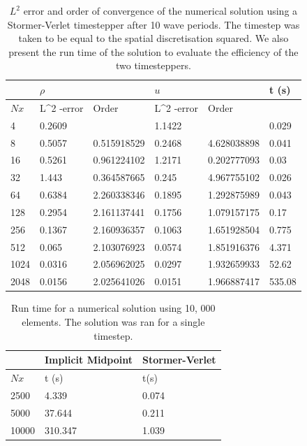 \documentclass[a4paper,11pt]{article}
\begin{document}
\begin{table}[]
\centering
\caption{$L^2$ error and order of convergence of the numerical solution using a Stormer-Verlet timestepper after 10 wave periods. The timestep was taken to be equal to the spatial discretisation squared. We also present the run time of the solution to evaluate the efficiency of the two timesteppers.  }
\label{sverror}
\begin{tabular}{@{}llllll@{}}
\toprule
     & \multicolumn{2}{l}{$\rho$}               & \multicolumn{2}{l}{$u$}                  & t (s)  \\ \midrule
$Nx$ & L\textasciicircum 2 -error & Order       & L\textasciicircum 2 -error & Order       &        \\
 \toprule
4    & 0.2609                     &             & 1.1422                     &             & 0.029  \\
8    & 0.5057                     & 0.515918529 & 0.2468                     & 4.628038898 & 0.041  \\
16   & 0.5261                     & 0.961224102 & 1.2171                     & 0.202777093 & 0.03   \\
32   & 1.443                      & 0.364587665 & 0.245                      & 4.967755102 & 0.026  \\
64   & 0.6384                     & 2.260338346 & 0.1895                     & 1.292875989 & 0.043  \\
128  & 0.2954                     & 2.161137441 & 0.1756                     & 1.079157175 & 0.17   \\
256  & 0.1367                     & 2.160936357 & 0.1063                     & 1.651928504 & 0.775  \\
512  & 0.065                      & 2.103076923 & 0.0574                     & 1.851916376 & 4.371  \\
1024 & 0.0316                     & 2.056962025 & 0.0297                     & 1.932659933 & 52.62  \\
2048 & 0.0156                     & 2.025641026 & 0.0151                     & 1.966887417 & 535.08 \\ \bottomrule
\end{tabular}
\end{table}




\begin{table}[]
\centering
\caption{Run time for a numerical solution using 10, 000 elements. The solution was ran for a single timestep. }
\label{stresstest}
\begin{tabular}{@{}lll@{}}
\toprule
      & Implicit Midpoint & Stormer-Verlet \\
      \toprule
$Nx$  & t (s)             & t(s)           \\
2500 & 4.339 & 0.074 \\
5000 &  37.644 &  0.211\\
10000 & 310.347          &  1.039        \\ \bottomrule
\end{tabular}
\end{table}
\end{document}
